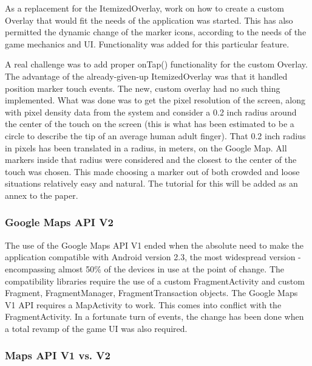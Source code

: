 \documentclass{article}
\begin{document}
As a replacement for the ItemizedOverlay, work on how to create a custom Overlay
that would fit the needs of the application was started. This has also permitted
the dynamic change of the marker icons, according to the needs of the game
mechanics and UI. Functionality was added for this particular feature. \newline

A real challenge was to add proper onTap() functionality for the custom Overlay.
The advantage of the already-given-up ItemizedOverlay was that it handled
position marker touch events. The new, custom overlay had no such thing
implemented. What was done was to get the pixel resolution of the screen, along
with pixel density data from the system and consider a 0.2 inch radius around
the center of the touch on the screen (this is what has been estimated to be
a circle to describe the tip of an average human adult finger). That 0.2 inch
radius in pixels has been translated in a radius, in meters, on the Google Map.
All markers inside that radius were considered and the closest to the center of
the touch was chosen. This made choosing a marker out of both crowded and loose
situations relatively easy and natural. The tutorial for this will be added as
an annex to the paper.\newline

\subsubsection{Google Maps API V2}

The use of the Google Maps API V1 ended when the absolute need to make the
application compatible with Android version 2.3, the most widespread version -
encompassing almost 50\% of the devices in use at the point of change. The
compatibility libraries require the use of a custom FragmentActivity and custom
Fragment, FragmentManager, FragmentTransaction objects. The Google Maps V1 API
requires a MapActivity to work. This comes into conflict with the
FragmentActivity. In a fortunate turn of events, the change has been done when a
total revamp of the game UI was also required.

\subsubsection{Maps API V1 vs. V2}
\end{document}

